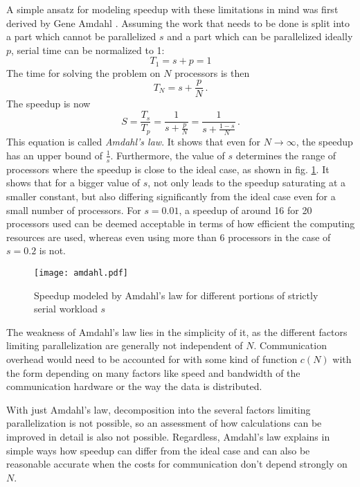 \documentclass[main.tex]{subfiles}
\begin{document}
A simple ansatz for modeling speedup with these limitations in mind was first derived by Gene Amdahl \cite{amdahl_validity_1967}.
Assuming the work that needs to be done is split into a part which cannot be parallelized \(s\) and a part which can be parallelized ideally \(p\), serial time can be normalized to 1:
\begin{equation}
    T_1 = s + p = 1
\end{equation}
The time for solving the problem on \(N\) processors is then
\begin{equation}
    T_N = s + \frac{p}{N}\,.
\end{equation}
The speedup is now
\begin{equation}\label{eq:amdahls_law}
    S = \frac{T_s}{T_p} = \frac{1}{s + \frac{p}{N}} = \frac{1}{s + \frac{1 - s}{N}}\,.
\end{equation}
This equation is called \emph{Amdahl's law}.
It shows that even for \(N \to \infty\), the speedup has an upper bound of \(\frac{1}{s}\).
Furthermore, the value of \(s\) determines the range of processors where the speedup is close to the ideal case, as shown in fig. \ref{fig:amdahl}.
It shows that for a bigger value of \(s\), not only leads to the speedup saturating at a smaller constant, but also differing significantly from the ideal case even for a small number of processors.
For \(s = 0.01\), a speedup of around 16 for 20 processors used can be deemed acceptable in terms of how efficient the computing resources are used, whereas even using more than 6 processors in the case of \(s = 0.2\) is not.

\begin{figure}
    \centering
    \texttt{[image: amdahl.pdf]}
    \caption{Speedup modeled by Amdahl's law for different portions of strictly serial workload \(s\)}
    \label{fig:amdahl}
\end{figure}

The weakness of Amdahl's law lies in the simplicity of it, as the different factors limiting parallelization are generally not independent of \(N\).
Communication overhead would need to be accounted for with some kind of function \(c(N)\) with the form depending on many factors like speed and bandwidth of the communication hardware or the way the data is distributed.

With just Amdahl's law, decomposition into the several factors limiting parallelization is not possible, so an assessment of how calculations can be improved in detail is also not possible.
Regardless, Amdahl's law explains in simple ways how speedup can differ from the ideal case and can also be reasonable accurate when the costs for communication don't depend strongly on \(N\).
\end{document}
